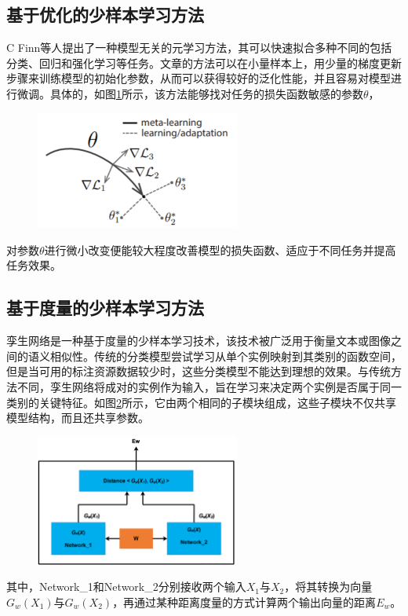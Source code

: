 \subsection{基于优化的少样本学习方法}
C Finn等人\cite{finn2017model}提出了一种模型无关的元学习方法，其可以快速拟合多种不同的包括分类、回归和强化学习等任务。文章的方法可以在小量样本上，用少量的梯度更新步骤来训练模型的初始化参数，从而可以获得较好的泛化性能，并且容易对模型进行微调。具体的，如图\ref{fig:few-optim}所示，该方法能够找对任务的损失函数敏感的参数$\theta$，
\begin{figure}[htb]
    \centering
    \includegraphics[width=0.6\textwidth]{Img/few-optim.png}
    \label{fig:few-optim}
\end{figure}
对参数$\theta$进行微小改变便能较大程度改善模型的损失函数、适应于不同任务并提高任务效果。



\subsection{基于度量的少样本学习方法}
孪生网络\cite{bromley1994signature}是一种基于度量的少样本学习技术，该技术被广泛用于衡量文本或图像之间的语义相似性\cite{mueller2016siamese}。传统的分类模型尝试学习从单个实例映射到其类别的函数空间，但是当可用的标注资源数据较少时，这些分类模型不能达到理想的效果。与传统方法不同，孪生网络将成对的实例作为输入，旨在学习来决定两个实例是否属于同一类别的关键特征。如图\ref{fig:siamese-model}所示，它由两个相同的子模块组成，这些子模块不仅共享模型结构，而且还共享参数。
\begin{figure}[htb]
    \centering
    \includegraphics[width=0.6\textwidth]{Img/siamese-model.png}
    \label{fig:siamese-model}
\end{figure}
其中，Network\_1和Network\_2分别接收两个输入$X_1$与$X_2$，将其转换为向量$G_w(X_1)$与$G_w(X_2)$，再通过某种距离度量的方式计算两个输出向量的距离$E_w$。


